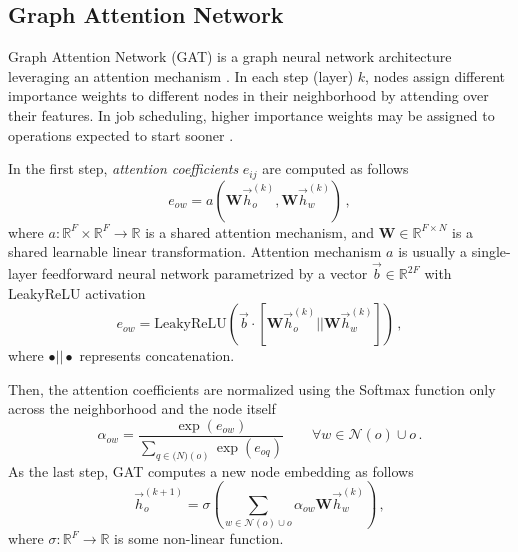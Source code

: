 \subsection{Graph Attention Network}
Graph Attention Network (GAT) is a graph neural network architecture leveraging an attention mechanism \cite{veličković2018graph}. In each step (layer) $k$, nodes assign different importance weights to different nodes in their neighborhood by attending over their features. In job scheduling, higher importance weights may be assigned to operations expected to start sooner \cite{9826438}.
\par
In the first step, \textit{attention coefficients} $e_{ij}$ are computed as follows \cite{9826438, veličković2018graph}
\begin{equation} \label{equation:2.6}
	e_{ow} = a\left ( \boldsymbol{W} \vec{h}_o^{(k)}, \boldsymbol{W} \vec{h}_w^{(k)}  \right ) \, ,
\end{equation}  
where $a: \mathbb{R}^F \times \mathbb{R}^F \rightarrow \mathbb{R}$ is a shared attention mechanism, and $\boldsymbol{W} \in \mathbb{R}^{F \times N}$ is a shared learnable linear transformation. Attention mechanism $a$ is usually a single-layer feedforward neural network parametrized by a vector $\vec{b} \in \mathbb{R}^{2F}$ with LeakyReLU activation \cite{9826438, veličković2018graph, DBLP:journals/corr/abs-2105-14491}
\begin{equation} \label{equation:2.7}
	e_{ow} = \text{LeakyReLU}\left ( \vec{b} \cdot \left [ \boldsymbol{W}\vec{h}_o^{(k)} || \boldsymbol{W}\vec{h}_w^{(k)} \right ] \right ) \, ,
\end{equation}
where $\bullet||\bullet$ represents concatenation.
\par
Then, the attention coefficients are normalized using the Softmax function only across the neighborhood and the node itself \cite{9826438, veličković2018graph}
\begin{equation}
	\alpha_{ow} = \frac{\exp(e_{ow})}{\sum_{q \in \mathcal(N)(o)} \exp(e_{oq})} \hspace{2em} \forall w \in \mathcal{N}(o) \cup {o} \, .
\end{equation}
As the last step, GAT computes a new node embedding as follows \cite{9826438, veličković2018graph}
\begin{equation} \label{equation:2.9}
	\vec{h}_o^{(k+1)} = \sigma \left ( \sum_{w \in \mathcal{N}(o) \cup {o}} \alpha_{ow} \boldsymbol{W} \vec{h}_w^{(k)} \right ) \, ,
\end{equation}
where $\sigma: \mathbb{R}^F \rightarrow \mathbb{R}$ is some non-linear function. 
